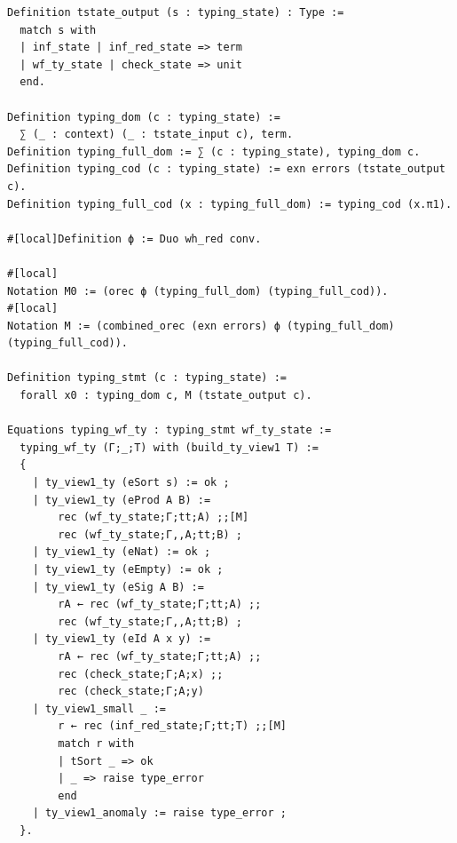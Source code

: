 \begin{lstlisting}
Definition tstate_output (s : typing_state) : Type :=
  match s with
  | inf_state | inf_red_state => term
  | wf_ty_state | check_state => unit
  end.

Definition typing_dom (c : typing_state) :=
  ∑ (_ : context) (_ : tstate_input c), term.
Definition typing_full_dom := ∑ (c : typing_state), typing_dom c.
Definition typing_cod (c : typing_state) := exn errors (tstate_output c).
Definition typing_full_cod (x : typing_full_dom) := typing_cod (x.π1).

#[local]Definition ϕ := Duo wh_red conv.

#[local]
Notation M0 := (orec ϕ (typing_full_dom) (typing_full_cod)).
#[local]
Notation M := (combined_orec (exn errors) ϕ (typing_full_dom) (typing_full_cod)).

Definition typing_stmt (c : typing_state) :=
  forall x0 : typing_dom c, M (tstate_output c).

Equations typing_wf_ty : typing_stmt wf_ty_state :=
  typing_wf_ty (Γ;_;T) with (build_ty_view1 T) :=
  {
    | ty_view1_ty (eSort s) := ok ;
    | ty_view1_ty (eProd A B) :=
        rec (wf_ty_state;Γ;tt;A) ;;[M]
        rec (wf_ty_state;Γ,,A;tt;B) ;
    | ty_view1_ty (eNat) := ok ;
    | ty_view1_ty (eEmpty) := ok ;
    | ty_view1_ty (eSig A B) :=
        rA ← rec (wf_ty_state;Γ;tt;A) ;;
        rec (wf_ty_state;Γ,,A;tt;B) ;
    | ty_view1_ty (eId A x y) :=
        rA ← rec (wf_ty_state;Γ;tt;A) ;;
        rec (check_state;Γ;A;x) ;;
        rec (check_state;Γ;A;y)
    | ty_view1_small _ :=
        r ← rec (inf_red_state;Γ;tt;T) ;;[M]
        match r with
        | tSort _ => ok
        | _ => raise type_error
        end
    | ty_view1_anomaly := raise type_error ;
  }.


\end{lstlisting}
